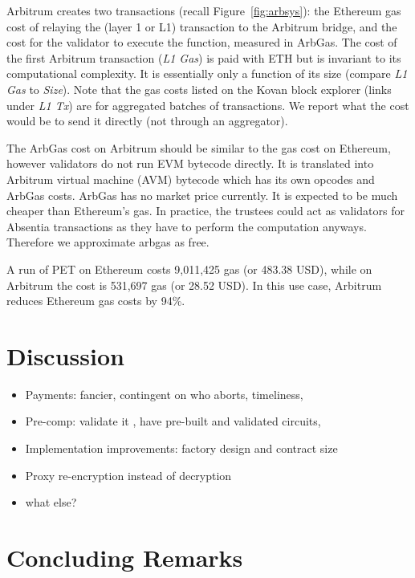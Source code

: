 Arbitrum creates two transactions (recall Figure~\ref{fig:arbsys}): the Ethereum gas cost of relaying the (layer 1 or L1) transaction to the Arbitrum bridge, and the cost for the validator to execute the function, measured in ArbGas. The cost of the first Arbitrum transaction (\emph{L1 Gas}) is paid with ETH but is invariant to its computational complexity. It is essentially only a function of its size (compare \emph{L1 Gas} to \emph{Size}).  Note that the gas costs listed on the Kovan block explorer (links under \emph{L1 Tx}) are for aggregated batches of transactions. We report what the cost would be to send it directly (not through an aggregator).

The ArbGas cost on Arbitrum should be similar to the gas cost on Ethereum, however validators do not run EVM bytecode directly. It is translated into Arbitrum virtual machine (AVM) bytecode which has its own opcodes and ArbGas costs. ArbGas has no market price currently. It is expected to be much cheaper than Ethereum's gas. In practice, the trustees could act as validators for Absentia transactions as they have to perform the computation anyways. Therefore we approximate arbgas as free.

A run of PET on Ethereum costs 9,011,425 gas (or 483.38 USD), while on Arbitrum the cost is 531,697 gas (or 28.52 USD). In this use case, Arbitrum reduces Ethereum gas costs by 94\%.  





\section{Discussion}
\label{sec:discussion}
\begin{itemize}
\item Payments: fancier, contingent on who aborts, timeliness, \etc
\item Pre-comp: validate it , have pre-built and validated circuits, \etc
\item Implementation improvements: factory design and contract size
\item Proxy re-encryption instead of decryption
\item what else?
\end{itemize}


\section{Concluding Remarks}
